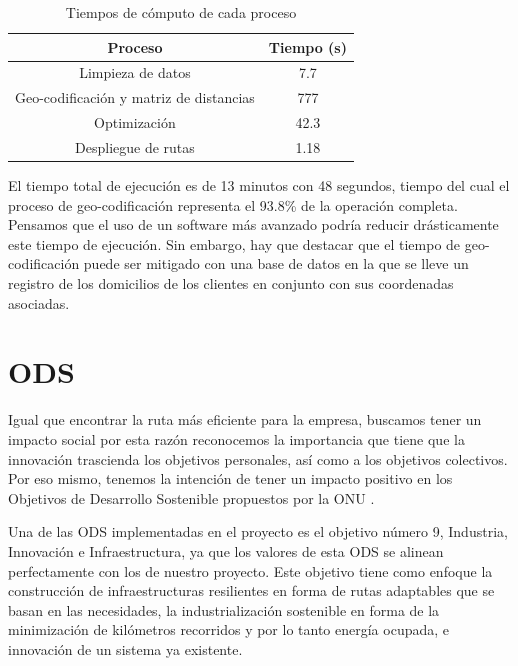 \documentclass[journal]{IEEEtran}
\begin{document}
            \begin{table}[h!]
                \centering
                \begin{tabular}{ ||c|c|| }
                    \hline
                    Proceso & Tiempo (s) \\
                    \hline
                    Limpieza de datos & 7.7 \\
                    \hline
                    Geo-codificación y matriz de distancias & 777 \\
                    \hline
                    Optimización & 42.3 \\
                    \hline
                    Despliegue de rutas & 1.18 \\
                    \hline
                \end{tabular}
                \caption{Tiempos de cómputo de cada proceso}
                \label{table:execution-times}
            \end{table}

            El tiempo total de ejecución es de 13 minutos con 48 segundos, tiempo del cual el proceso de geo-codificación representa el 93.8\% de la operación completa. Pensamos que el uso de un software más avanzado podría reducir drásticamente este tiempo de ejecución. Sin embargo, hay que destacar que el tiempo de geo-codificación puede ser mitigado con una base de datos en la que se lleve un registro de los domicilios de los clientes en conjunto con sus coordenadas asociadas.
        
    \section{ODS} \label{sec:ods}
    
        Igual que encontrar la ruta más eficiente para la empresa, buscamos tener un impacto social por esta razón reconocemos la importancia que tiene que la innovación trascienda los objetivos personales, así como a los objetivos colectivos. Por eso mismo, tenemos la intención de tener un impacto positivo en los Objetivos de Desarrollo Sostenible propuestos por la ONU \cite{united-nations-2015}. 
        
        Una de las ODS implementadas en el proyecto es el objetivo número 9,  Industria, Innovación e Infraestructura, ya que los valores de esta ODS se alinean perfectamente con los de nuestro proyecto. Este objetivo tiene como enfoque la construcción de infraestructuras resilientes en forma de rutas adaptables que se basan en las necesidades, la industrialización sostenible en forma de la minimización de kilómetros recorridos y por lo tanto energía ocupada, e innovación de un sistema ya existente. 
        
\end{document}
